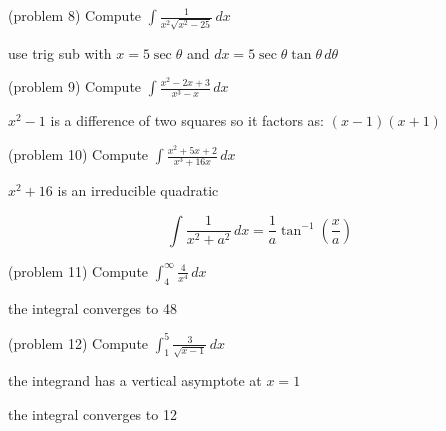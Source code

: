 \documentclass[handout]{ximera}
\begin{document}
\begin{problem}(problem 8)
Compute $\displaystyle \int \frac{1}{x^2 \sqrt{x^2 - 25}} \, dx$

\begin{hint}
use trig sub with $x = 5\sec \theta$ and $dx = 5 \sec \theta \tan \theta \, d\theta$
\end{hint}

\end{problem}


\begin{problem}(problem 9)
Compute $\displaystyle \int \frac{x^2 - 2x+3}{x^3-x} \, dx$

\begin{hint}
$x^2 - 1$ is a difference of two squares so it factors as: $(x-1)(x+1)$
\end{hint}

\end{problem}


\begin{problem}(problem 10)
Compute $\displaystyle \int \frac{x^2 + 5x + 2}{x^3 + 16x} \, dx$

\begin{hint}
$x^2 + 16$ is an irreducible quadratic
\end{hint}

\begin{hint}
\[
\int \frac{1}{x^2 + a^2} \, dx = \frac{1}{a} \tan^{-1}\left(\frac{x}{a}\right)
\]
\end{hint}

\end{problem}


\begin{problem}(problem 11)
Compute $\displaystyle \int_4^\infty \frac{4}{x^4} \, dx$

\begin{hint}
the integral converges to 48
\end{hint}

\end{problem}


\begin{problem}(problem 12)
Compute $\displaystyle \int_1^5 \frac{3}{\sqrt{x-1}} \, dx$

\begin{hint}
the integrand has a vertical asymptote at $x = 1$
\end{hint}

\begin{hint}
the integral converges to 12
\end{hint}


\end{problem}
\end{document}
